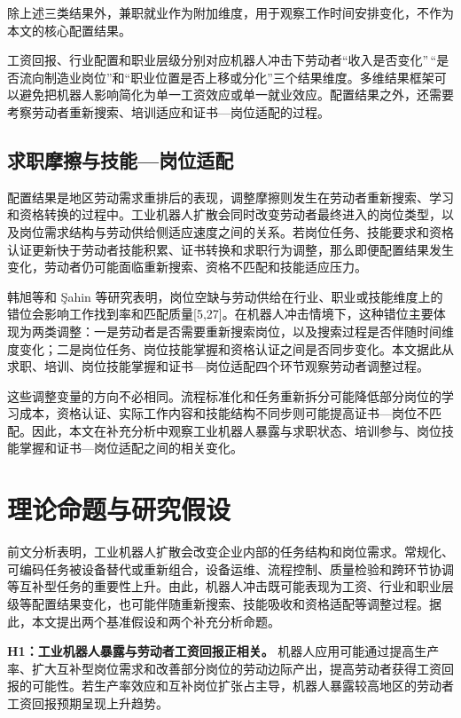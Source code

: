 \documentclass[UTF8, zihao=-4, a4paper, openany, fontset=none]{ctexrep}
\numberwithin{equation}{chapter}
\begin{document}
除上述三类结果外，兼职就业作为附加维度，用于观察工作时间安排变化，不作为本文的核心配置结果。

工资回报、行业配置和职业层级分别对应机器人冲击下劳动者``收入是否变化''\,``是否流向制造业岗位''和``职业位置是否上移或分化''三个结果维度。多维结果框架可以避免把机器人影响简化为单一工资效应或单一就业效应。配置结果之外，还需要考察劳动者重新搜索、培训适应和证书---岗位适配的过程。

\subsection{求职摩擦与技能---岗位适配}\label{ux6c42ux804cux6469ux64e6ux4e0eux6280ux80fdux5c97ux4f4dux9002ux914d}

配置结果是地区劳动需求重排后的表现，调整摩擦则发生在劳动者重新搜索、学习和资格转换的过程中。工业机器人扩散会同时改变劳动者最终进入的岗位类型，以及岗位需求结构与劳动供给侧适应速度之间的关系。若岗位任务、技能要求和资格认证更新快于劳动者技能积累、证书转换和求职行为调整，那么即便配置结果发生变化，劳动者仍可能面临重新搜索、资格不匹配和技能适应压力。

韩旭等和 Şahin 等研究表明，岗位空缺与劳动供给在行业、职业或技能维度上的错位会影响工作找到率和匹配质量{[}5,27{]}。在机器人冲击情境下，这种错位主要体现为两类调整：一是劳动者是否需要重新搜索岗位，以及搜索过程是否伴随时间维度变化；二是岗位任务、岗位技能掌握和资格认证之间是否同步变化。本文据此从求职、培训、岗位技能掌握和证书---岗位适配四个环节观察劳动者调整过程。

这些调整变量的方向不必相同。流程标准化和任务重新拆分可能降低部分岗位的学习成本，资格认证、实际工作内容和技能结构不同步则可能提高证书---岗位不匹配。因此，本文在补充分析中观察工业机器人暴露与求职状态、培训参与、岗位技能掌握和证书---岗位适配之间的相关变化。

\section{理论命题与研究假设}\label{ux7406ux8bbaux547dux9898ux4e0eux7814ux7a76ux5047ux8bbe}

前文分析表明，工业机器人扩散会改变企业内部的任务结构和岗位需求。常规化、可编码任务被设备替代或重新组合，设备运维、流程控制、质量检验和跨环节协调等互补型任务的重要性上升。由此，机器人冲击既可能表现为工资、行业和职业层级等配置结果变化，也可能伴随重新搜索、技能吸收和资格适配等调整过程。据此，本文提出两个基准假设和两个补充分析命题。

\textbf{H1：工业机器人暴露与劳动者工资回报正相关。}
机器人应用可能通过提高生产率、扩大互补型岗位需求和改善部分岗位的劳动边际产出，提高劳动者获得工资回报的可能性。若生产率效应和互补岗位扩张占主导，机器人暴露较高地区的劳动者工资回报预期呈现上升趋势。
\end{document}
